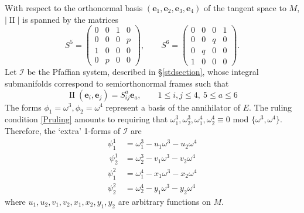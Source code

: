 \documentclass[12pt,reqno]{amsart}
\theoremstyle{definition}
\theoremstyle{remark}
\begin{document}
With respect to the orthonormal basis $({\mathbf e}_1, {\mathbf e}_2, {\mathbf e}_3, {\mathbf e}_4)$ of the tangent space to $M$, $| {\operatorname{II}} |$ is spanned by the matrices
$$S^5 = \begin{pmatrix} 0 & 0 & 1 & 0\\ 0 & 0 & 0 & p\\ 1 & 0 & 0 & 0 \\ 0 & p & 0 & 0 \end{pmatrix},\qquad
S^6 = \begin{pmatrix} 0 & 0& 0 & 1 \\ 0 & 0 & q & 0 \\ 0 & q & 0 & 0 \\ 1 & 0 & 0 & 0 \end{pmatrix}.$$
Let ${{\mathcal I}}$ be the Pfaffian system, described in \S\ref{stdsection}, whose integral submanifolds
correspond to semiorthonormal frames such that
\begin{equation}\label{twoexpand}
{\operatorname{II}}({\mathbf e}_i, {\mathbf e}_j) =  S^a_{ij} {\mathbf e}_a,  \qquad 1\le i,j \le 4, \  5\le a\le 6
\end{equation}
The forms $\phi_1={\omega}^3, \phi_2={\omega}^4$ represent a basis of the annihilator of $E$.
The ruling condition \eqref{Pruling} amounts to requiring that
$\omega^3_1, \omega_2^3, \omega_1^4, \omega_2^4\equiv 0$ mod $\{{\omega}^3, {\omega}^4\}$. Therefore, the `extra' 1-forms of ${{\mathcal I}}$ are
\begin{equation}\label{B1extra}
\begin{aligned}
\psi_1^1&=\omega^3_1-u_1{\omega}^3-u_2{\omega}^4\\\
\psi_2^1&=\omega_2^3-v_1{\omega}^3-v_2{\omega}^4\\
\psi_1^2&=\omega_1^4-x_1{\omega}^3-x_2{\omega}^4\\
\psi_2^2&=\omega_2^4-y_1{\omega}^3-y_2{\omega}^4
\end{aligned}\end{equation}
where $u_1, u_2, v_1, v_2, x_1,x_2, y_1, y_2$ are arbitrary functions on $M$.
\end{document}
